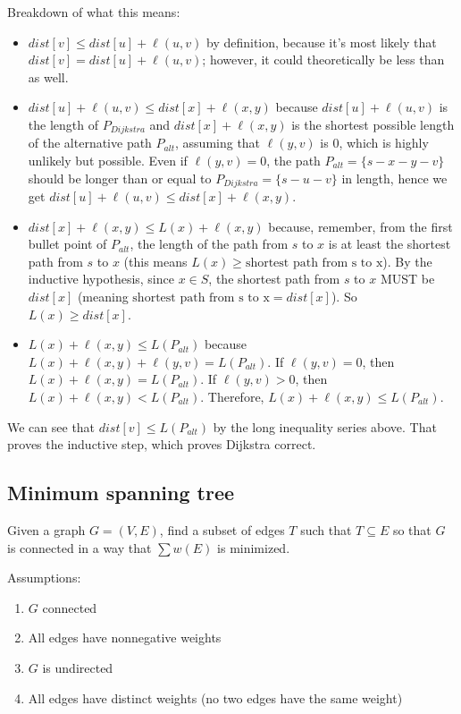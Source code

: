 \documentclass{article}
\begin{document}
Breakdown of what this means:
\begin{itemize}
    \item $dist[v] \leq dist[u] + \ell(u, v)$ by definition, because it's most likely that $dist[v] = dist[u] + \ell(u, v)$; however, it could theoretically be less than as well.
    \item $dist[u] + \ell(u, v) \leq dist[x] + \ell(x, y)$ because $dist[u] + \ell(u, v)$ is the length of $P_{Dijkstra}$ and $dist[x] + \ell(x, y)$ is the shortest possible length of the alternative path $P_{alt}$, assuming that $\ell(y, v)$ is $0$, which is highly unlikely but possible. Even if $\ell(y, v) = 0$, the path $P_{alt} = \{s - x - y - v\}$ should be longer than or equal to $P_{Dijkstra} = \{s - u - v\}$ in length, hence we get $dist[u] + \ell(u, v) \leq dist[x] + \ell(x, y)$.
    \item $dist[x] + \ell(x, y) \leq L(x) + \ell(x, y)$ because, remember, from the first bullet point of $P_{alt}$, the length of the path from $s$ to $x$ is at least the shortest path from $s$ to $x$ (this means $L(x) \geq \textrm{shortest path from s to x}$). By the inductive hypothesis, since $x \in S$, the shortest path from $s$ to $x$ MUST be $dist[x]$ (meaning $\textrm{shortest path from s to x} = dist[x]$). So $L(x) \geq dist[x]$.
    \item $L(x) + \ell(x, y) \leq L(P_{alt})$ because $L(x) + \ell(x, y) + \ell(y, v) = L(P_{alt})$. If $\ell(y, v) = 0$, then $L(x) + \ell(x, y) = L(P_{alt})$. If $\ell(y, v) > 0$, then $L(x) + \ell(x, y) < L(P_{alt})$. Therefore, $L(x) + \ell(x, y) \leq L(P_{alt})$.
\end{itemize}

We can see that $dist[v] \leq L(P_{alt})$ by the long inequality series above. That proves the inductive step, which proves Dijkstra correct.



\subsection{Minimum spanning tree}
Given a graph $G = (V, E)$, find a subset of edges $T$ such that $T \subseteq E$ so that $G$ is connected in a way that $\sum w(E)$ is minimized.

Assumptions:
\begin{enumerate}
    \item $G$ connected
    \item All edges have nonnegative weights
    \item $G$ is undirected
    \item All edges have distinct weights (no two edges have the same weight)
\end{enumerate}
\end{document}
